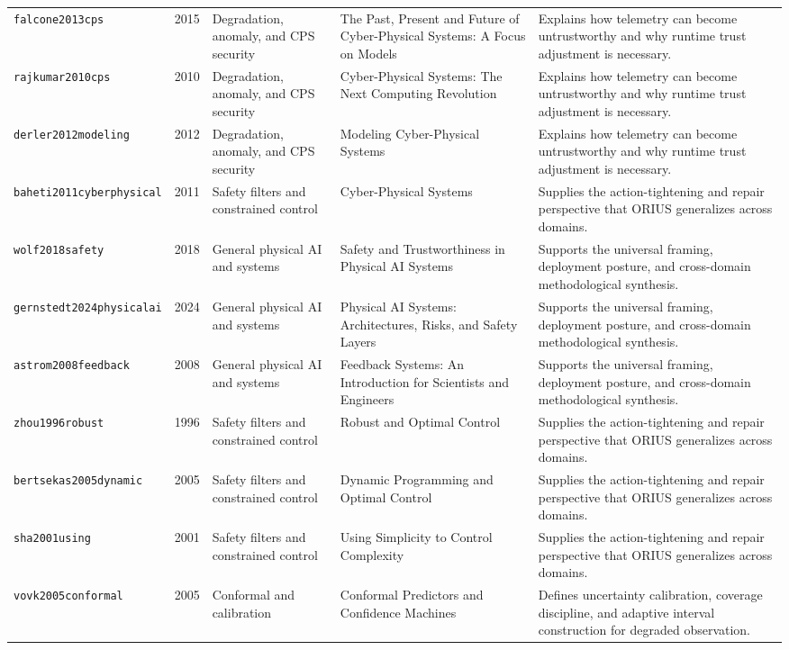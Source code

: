 \begin{longtable}{p{}p{}p{}p{}p{}}
\texttt{falcone2013cps} & 2015 & Degradation, anomaly, and CPS security & The Past, Present and Future of Cyber-Physical Systems: A Focus on Models & Explains how telemetry can become untrustworthy and why runtime trust adjustment is necessary.\\
\texttt{rajkumar2010cps} & 2010 & Degradation, anomaly, and CPS security & Cyber-Physical Systems: The Next Computing Revolution & Explains how telemetry can become untrustworthy and why runtime trust adjustment is necessary.\\
\texttt{derler2012modeling} & 2012 & Degradation, anomaly, and CPS security & Modeling Cyber-Physical Systems & Explains how telemetry can become untrustworthy and why runtime trust adjustment is necessary.\\
\texttt{baheti2011cyberphysical} & 2011 & Safety filters and constrained control & Cyber-Physical Systems & Supplies the action-tightening and repair perspective that ORIUS generalizes across domains.\\
\texttt{wolf2018safety} & 2018 & General physical AI and systems & Safety and Trustworthiness in Physical AI Systems & Supports the universal framing, deployment posture, and cross-domain methodological synthesis.\\
\texttt{gernstedt2024physicalai} & 2024 & General physical AI and systems & Physical AI Systems: Architectures, Risks, and Safety Layers & Supports the universal framing, deployment posture, and cross-domain methodological synthesis.\\
\texttt{astrom2008feedback} & 2008 & General physical AI and systems & Feedback Systems: An Introduction for Scientists and Engineers & Supports the universal framing, deployment posture, and cross-domain methodological synthesis.\\
\texttt{zhou1996robust} & 1996 & Safety filters and constrained control & Robust and Optimal Control & Supplies the action-tightening and repair perspective that ORIUS generalizes across domains.\\
\texttt{bertsekas2005dynamic} & 2005 & Safety filters and constrained control & Dynamic Programming and Optimal Control & Supplies the action-tightening and repair perspective that ORIUS generalizes across domains.\\
\texttt{sha2001using} & 2001 & Safety filters and constrained control & Using Simplicity to Control Complexity & Supplies the action-tightening and repair perspective that ORIUS generalizes across domains.\\
\texttt{vovk2005conformal} & 2005 & Conformal and calibration & Conformal Predictors and Confidence Machines & Defines uncertainty calibration, coverage discipline, and adaptive interval construction for degraded observation.\\

\end{longtable}
